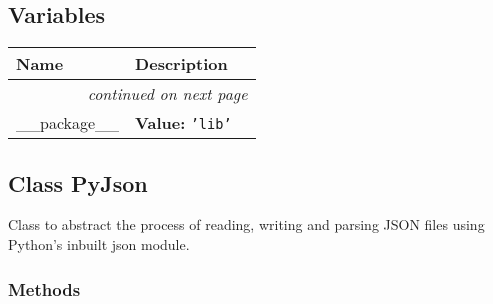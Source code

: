 
  \subsection{Variables}

    \vspace{-1cm}
\hspace{\varindent}\begin{longtable}{|p{\varnamewidth}|p{\vardescrwidth}|l}
\cline{1-2}
\cline{1-2} \centering \textbf{Name} & \centering \textbf{Description}& \\
\cline{1-2}
\endhead\cline{1-2}\multicolumn{3}{r}{\small\textit{continued on next page}}\\\endfoot\cline{1-2}
\endlastfoot\raggedright \_\-\_\-p\-a\-c\-k\-a\-g\-e\-\_\-\_\- & \raggedright \textbf{Value:} 
{\tt \texttt{'}\texttt{lib}\texttt{'}}&\\
\cline{1-2}
\end{longtable}



\subsection{Class PyJson}

    \label{lib:pyjson:PyJson}
Class to abstract the process of reading, writing and parsing JSON files 
using Python's inbuilt json module.



  \subsubsection{Methods}

    \label{lib:pyjson:PyJson:__init__}

